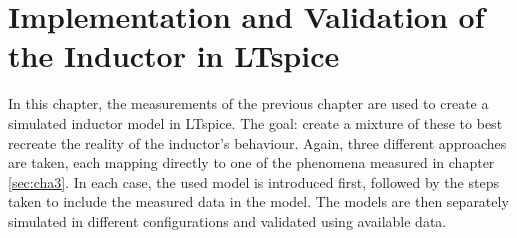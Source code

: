 \chapter{Implementation and Validation of the Inductor in LTspice} \label{sec:cha4}
In this chapter, the measurements of the previous chapter are used to create a simulated inductor model in LTspice. The goal: create a mixture of these to best recreate the reality of the inductor's behaviour. Again, three different approaches are taken, each mapping directly to one of the phenomena measured in chapter \ref{sec:cha3}. In each case, the used model is introduced first, followed by the steps taken to include the measured data in the model. The models are then separately simulated in different configurations and validated using available data. 

